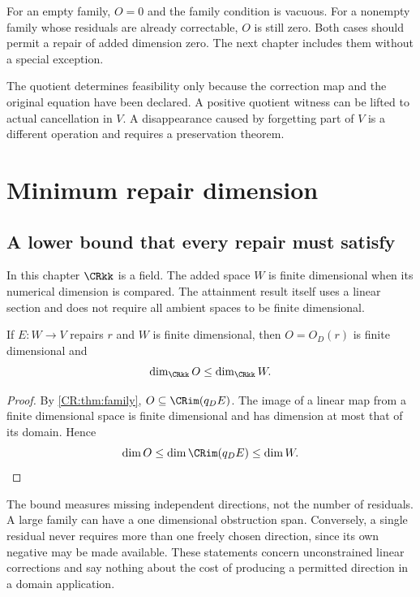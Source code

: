 For an empty family, $O=0$ and the family condition is vacuous. For a nonempty family whose residuals are already correctable, $O$ is still zero. Both cases should permit a repair of added dimension zero. The next chapter includes them without a special exception.

\begin{scopebox}[title=What has been established]
The quotient determines feasibility only because the correction map and the original equation have been declared. A positive quotient witness can be lifted to actual cancellation in $V$. A disappearance caused by forgetting part of $V$ is a different operation and requires a preservation theorem.
\end{scopebox}

\section{Minimum repair dimension}\label{CR:cr-source-section-2}\label{CR:ch:minimal}
\subsection{A lower bound that every repair must satisfy}
In this chapter $\CRkk$ is a field. The added space $W$ is finite dimensional when its numerical dimension is compared. The attainment result itself uses a linear section and does not require all ambient spaces to be finite dimensional.

\begin{CRtheorem}\label{CR:thm:lower}
If $E:W\to V$ repairs $r$ and $W$ is finite dimensional, then $O=O_D(r)$ is finite dimensional and
\[
\dim_{\CRkk}O\leq\dim_{\CRkk}W.
\]
\end{CRtheorem}
\begin{proof}
By \cref{CR:thm:family}, $O\subseteq\CRim(q_DE)$. The image of a linear map from a finite dimensional space is finite dimensional and has dimension at most that of its domain. Hence
\[
\dim O\leq\dim\CRim(q_DE)\leq\dim W.\qedhere
\]
\end{proof}

The bound measures missing independent directions, not the number of residuals. A large family can have a one dimensional obstruction span. Conversely, a single residual never requires more than one freely chosen direction, since its own negative may be made available. These statements concern unconstrained linear corrections and say nothing about the cost of producing a permitted direction in a domain application.

